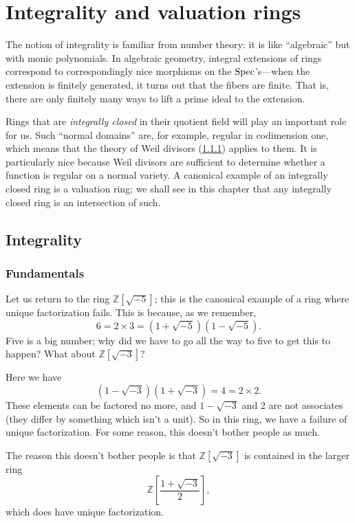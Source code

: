 \chapter{Integrality and valuation rings}

The notion of integrality is familiar from number theory: it is like
``algebraic'' but with monic polynomials. In algebraic geometry, integral
extensions of rings correspond to correspondingly nice morphisms on the
$\mathrm{Spec}$'s---when the extension is finitely generated, it turns out that the
fibers are finite. That is, there are only finitely many ways to lift a prime
ideal to the extension.

Rings that are \emph{integrally closed} in their quotient field will play an
important role for us. Such ``normal domains'' are, for example, regular in
codimension one, which means that the theory of Weil divisors (\ref{}) applies
to them. It is particularly nice because Weil divisors are sufficient to
determine whether a function is regular on a normal variety.
A canonical example of an integrally closed ring is a valuation ring; we shall
see in this chapter that any integrally closed ring is an intersection of such.

\section{Integrality}

\subsection{Fundamentals}

Let us return to the ring $\mathbb{Z}[\sqrt{-5}]$; this is the canonical
example of a ring where unique factorization fails. This is because, as we
remember,
\[ 6 = 2 \times 3 = (1+\sqrt{-5})(1-\sqrt{-5}).  \]
Five is a big number; why did we have to go all the way to five to get this to
happen?
What about $\mathbb{Z}[\sqrt{-3}]$?

Here we have
\[ (1 - \sqrt{-3})(1+\sqrt{-3}) = 4 = 2 \times 2.  \]
These elements can be factored no more, and $1 - \sqrt{-3}$ and $2$ are not
associates (they differ by something which isn't a unit).
So in this ring, we have a failure of unique factorization. For some reason,
this doesn't bother people as much.

The reason this doesn't bother people is that $\mathbb{Z}[\sqrt{-3}]$ is
contained in the larger ring
\[ \mathbb{Z}[ \frac{1 + \sqrt{-3}}{2}],  \]
which does have unique factorization.

